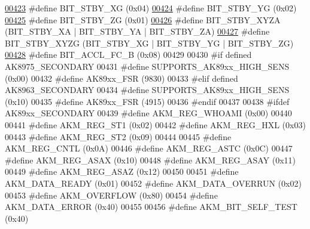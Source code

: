 \begin{DoxyCode}
\hypertarget{inv__mpu_8c_source.tex_l00423}{}\hyperlink{inv__mpu_8c_a82256fedeffe5b2443ab3ae34cf032d9}{00423} \textcolor{preprocessor}{#define BIT\_STBY\_XG         (0x04)}
\hypertarget{inv__mpu_8c_source.tex_l00424}{}\hyperlink{inv__mpu_8c_abf1c0a844906a5e887a659971a4af417}{00424} \textcolor{preprocessor}{#define BIT\_STBY\_YG         (0x02)}
\hypertarget{inv__mpu_8c_source.tex_l00425}{}\hyperlink{inv__mpu_8c_a30967a4efdf3c3f1e39814e72a4168b0}{00425} \textcolor{preprocessor}{#define BIT\_STBY\_ZG         (0x01)}
\hypertarget{inv__mpu_8c_source.tex_l00426}{}\hyperlink{inv__mpu_8c_a04a57159e34387dafe9b86b171c4654c}{00426} \textcolor{preprocessor}{#define BIT\_STBY\_XYZA       (BIT\_STBY\_XA | BIT\_STBY\_YA | BIT\_STBY\_ZA)}
\hypertarget{inv__mpu_8c_source.tex_l00427}{}\hyperlink{inv__mpu_8c_a4e2ef22b94b90f9b83394dfe1f688ce4}{00427} \textcolor{preprocessor}{#define BIT\_STBY\_XYZG       (BIT\_STBY\_XG | BIT\_STBY\_YG | BIT\_STBY\_ZG)}
\hypertarget{inv__mpu_8c_source.tex_l00428}{}\hyperlink{inv__mpu_8c_a51c6f0bce9d0ad115514fd5d343c76e9}{00428} \textcolor{preprocessor}{#define BIT\_ACCL\_FC\_B       (0x08)}
00429 
00430 \textcolor{preprocessor}{#if defined AK8975\_SECONDARY}
00431 \textcolor{preprocessor}{#define SUPPORTS\_AK89xx\_HIGH\_SENS   (0x00)}
00432 \textcolor{preprocessor}{#define AK89xx\_FSR                  (9830)}
00433 \textcolor{preprocessor}{#elif defined AK8963\_SECONDARY}
00434 \textcolor{preprocessor}{#define SUPPORTS\_AK89xx\_HIGH\_SENS   (0x10)}
00435 \textcolor{preprocessor}{#define AK89xx\_FSR                  (4915)}
00436 \textcolor{preprocessor}{#endif}
00437 
00438 \textcolor{preprocessor}{#ifdef AK89xx\_SECONDARY}
00439 \textcolor{preprocessor}{#define AKM\_REG\_WHOAMI      (0x00)}
00440 
00441 \textcolor{preprocessor}{#define AKM\_REG\_ST1         (0x02)}
00442 \textcolor{preprocessor}{#define AKM\_REG\_HXL         (0x03)}
00443 \textcolor{preprocessor}{#define AKM\_REG\_ST2         (0x09)}
00444 
00445 \textcolor{preprocessor}{#define AKM\_REG\_CNTL        (0x0A)}
00446 \textcolor{preprocessor}{#define AKM\_REG\_ASTC        (0x0C)}
00447 \textcolor{preprocessor}{#define AKM\_REG\_ASAX        (0x10)}
00448 \textcolor{preprocessor}{#define AKM\_REG\_ASAY        (0x11)}
00449 \textcolor{preprocessor}{#define AKM\_REG\_ASAZ        (0x12)}
00450 
00451 \textcolor{preprocessor}{#define AKM\_DATA\_READY      (0x01)}
00452 \textcolor{preprocessor}{#define AKM\_DATA\_OVERRUN    (0x02)}
00453 \textcolor{preprocessor}{#define AKM\_OVERFLOW        (0x80)}
00454 \textcolor{preprocessor}{#define AKM\_DATA\_ERROR      (0x40)}
00455 
00456 \textcolor{preprocessor}{#define AKM\_BIT\_SELF\_TEST   (0x40)}

\end{DoxyCode}
